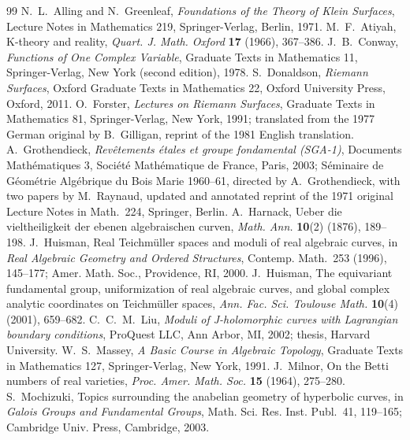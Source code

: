 \renewcommand{\bibname}{第 2 章参考文献}

\begin{thebibliography}{99}\setlength{\itemsep}{0.25em}
 N.~L.~Alling and N.~Greenleaf, \emph{Foundations of the Theory of Klein
Surfaces}, Lecture Notes in Mathematics 219, Springer-Verlag, Berlin, 1971.
 M.~F.~Atiyah, K-theory and reality, \emph{Quart. J. Math. Oxford}
\textbf{17} (1966), 367--386.
 J.~B.~Conway, \emph{Functions of One Complex Variable}, Graduate Texts in
Mathematics 11, Springer-Verlag, New York (second edition), 1978.
 S.~Donaldson, \emph{Riemann Surfaces}, Oxford Graduate Texts in
Mathematics 22, Oxford University Press, Oxford, 2011.
 O.~Forster, \emph{Lectures on Riemann Surfaces}, Graduate Texts in
Mathematics 81, Springer-Verlag, New York, 1991; translated from the 1977 German original
by B.~Gilligan, reprint of the 1981 English translation.
 A.~Grothendieck, \emph{Revêtements étales et groupe fondamental
(SGA-1)}, Documents Mathématiques 3, Société Mathématique de France, Paris, 2003;
Séminaire de Géométrie Algébrique du Bois Marie 1960--61, directed by A.~Grothendieck,
with two papers by M.~Raynaud, updated and annotated reprint of the 1971 original Lecture
Notes in Math.~224, Springer, Berlin.
 A.~Harnack, Ueber die vieltheiligkeit der ebenen algebraischen curven,
\emph{Math. Ann.} \textbf{10}(2) (1876), 189--198.
 J.~Huisman, Real Teichmüller spaces and moduli of real algebraic
curves, in \emph{Real Algebraic Geometry and Ordered Structures}, Contemp. Math.~253
(1996), 145--177; Amer. Math. Soc., Providence, RI, 2000.
 J.~Huisman, The equivariant fundamental group, uniformization of real
algebraic curves, and global complex analytic coordinates on Teichmüller spaces,
\emph{Ann. Fac. Sci. Toulouse Math.} \textbf{10}(4) (2001), 659--682.
 C.~C.~M.~Liu, \emph{Moduli of J-holomorphic curves with Lagrangian boundary
conditions}, ProQuest LLC, Ann Arbor, MI, 2002; thesis, Harvard University.
 W.~S.~Massey, \emph{A Basic Course in Algebraic Topology}, Graduate Texts
in Mathematics 127, Springer-Verlag, New York, 1991.
 J.~Milnor, On the Betti numbers of real varieties, \emph{Proc. Amer.
Math. Soc.} \textbf{15} (1964), 275--280.
 S.~Mochizuki, Topics surrounding the anabelian geometry of hyperbolic
curves, in \emph{Galois Groups and Fundamental Groups}, Math. Sci. Res. Inst. Publ.~41,
119--165; Cambridge Univ. Press, Cambridge, 2003.

\end{thebibliography}
